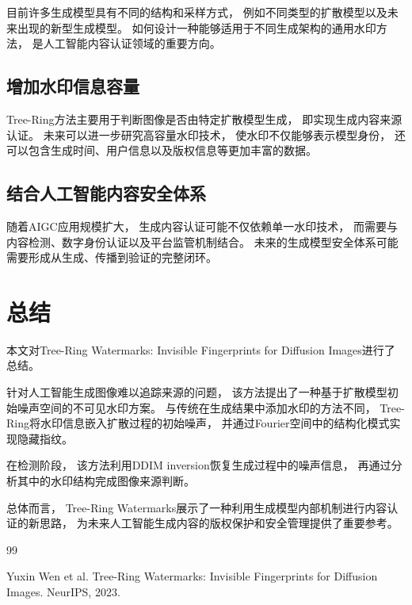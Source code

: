 \documentclass[12pt,a4paper]{article}
\begin{document}
目前许多生成模型具有不同的结构和采样方式，
例如不同类型的扩散模型以及未来出现的新型生成模型。
如何设计一种能够适用于不同生成架构的通用水印方法，
是人工智能内容认证领域的重要方向。


\subsection{增加水印信息容量}

Tree-Ring方法主要用于判断图像是否由特定扩散模型生成，
即实现生成内容来源认证。
未来可以进一步研究高容量水印技术，
使水印不仅能够表示模型身份，
还可以包含生成时间、用户信息以及版权信息等更加丰富的数据。


\subsection{结合人工智能内容安全体系}

随着AIGC应用规模扩大，
生成内容认证可能不仅依赖单一水印技术，
而需要与内容检测、数字身份认证以及平台监管机制结合。
未来的生成模型安全体系可能需要形成从生成、传播到验证的完整闭环。


\section{总结}

本文对Tree-Ring Watermarks:
Invisible Fingerprints for Diffusion Images进行了总结。

针对人工智能生成图像难以追踪来源的问题，
该方法提出了一种基于扩散模型初始噪声空间的不可见水印方案。
与传统在生成结果中添加水印的方法不同，
Tree-Ring将水印信息嵌入扩散过程的初始噪声，
并通过Fourier空间中的结构化模式实现隐藏指纹。

在检测阶段，
该方法利用DDIM inversion恢复生成过程中的噪声信息，
再通过分析其中的水印结构完成图像来源判断。

总体而言，
Tree-Ring Watermarks展示了一种利用生成模型内部机制进行内容认证的新思路，
为未来人工智能生成内容的版权保护和安全管理提供了重要参考。




\begin{thebibliography}{99}

Yuxin Wen et al.
Tree-Ring Watermarks: Invisible Fingerprints for Diffusion Images.
NeurIPS, 2023.

\end{thebibliography}
\end{document}
